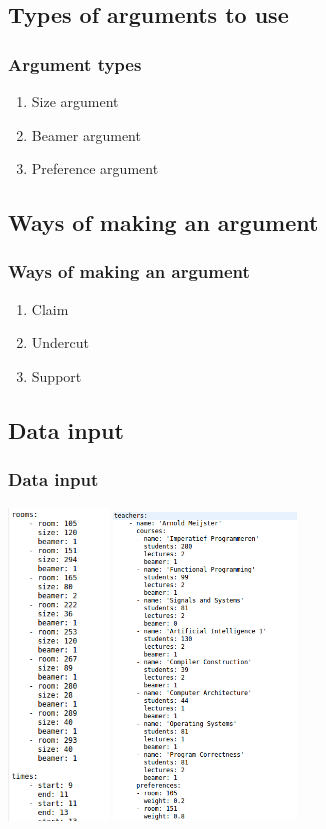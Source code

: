 \documentclass{beamer}
\begin{document}
\subsection{Types of arguments to use}
\begin{frame}
	\frametitle{Argument types}
	\begin{enumerate}
		\item Size argument 
		\item Beamer argument
		\item Preference argument
	\end{enumerate}
\end{frame}

\subsection{Ways of making an argument}
\begin{frame}
	\frametitle{Ways of making an argument}
	\begin{enumerate}
		\item Claim
		\item Undercut
		\item Support
	\end{enumerate}
\end{frame}

\subsection{Data input}
\begin{frame}
	\frametitle{Data input}
	\center
	\includegraphics[width=0.2\textwidth]{Rooms.png}%
	\includegraphics[width=0.365\textwidth]{Teachers.png}
\end{frame}
\end{document}
